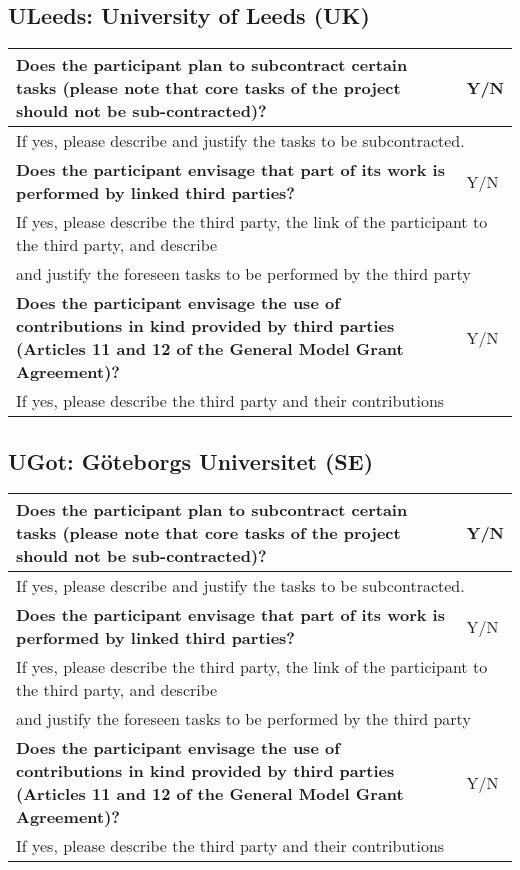 \subsection{ULeeds: University of Leeds (UK)}

\begin{longtable}{|p{}|p{}|}
\hline
{\bf Does the participant plan to subcontract certain tasks (please
  note that core tasks of the project should not be sub-contracted)?}
&
Y/N
\\
\hline
\multicolumn{2}{|l|}{
If yes, please describe and justify the tasks to be subcontracted.}
\\
\hline
{\bf Does the participant envisage that  part of its work is performed
  by linked third parties?}
&
Y/N
\\
\hline
\multicolumn{2}{|l|}{If yes, please describe the third party, the link of the
  participant to the third party, and describe}\\
\multicolumn{2}{|l|}{and justify the foreseen
tasks to be performed by the third party}
\\
\hline
{\bf Does the participant envisage the use of contributions in kind
provided by third parties (Articles 11 and 12 of the General Model
Grant Agreement)?}
&
Y/N
\\
\hline
\multicolumn{2}{|l|}{If yes, please describe the third party and their contributions}
\\
\hline
\end{longtable}


\subsection{UGot: Göteborgs Universitet (SE)}

\begin{longtable}{|p{}|p{}|}
\hline
{\bf Does the participant plan to subcontract certain tasks (please
  note that core tasks of the project should not be sub-contracted)?}
&
Y/N
\\
\hline
\multicolumn{2}{|l|}{
If yes, please describe and justify the tasks to be subcontracted.}
\\
\hline
{\bf Does the participant envisage that  part of its work is performed
  by linked third parties?}
&
Y/N
\\
\hline
\multicolumn{2}{|l|}{If yes, please describe the third party, the link of the
  participant to the third party, and describe}\\
\multicolumn{2}{|l|}{and justify the foreseen
tasks to be performed by the third party}
\\
\hline
{\bf Does the participant envisage the use of contributions in kind
provided by third parties (Articles 11 and 12 of the General Model
Grant Agreement)?}
&
Y/N
\\
\hline
\multicolumn{2}{|l|}{If yes, please describe the third party and their contributions}
\\
\hline
\end{longtable}

